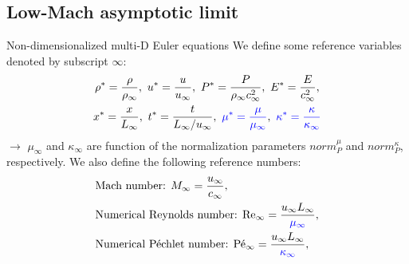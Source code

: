 \documentclass[xcolor=dvipsnames,10pt]{beamer}
\renewcommand{\Re}{\textrm{Re}}
\newcommand{\Pe}{\textrm{P\'e}}
\renewcommand{\Pr}{\textrm{Pr}}
\begin{document}
\subsection{Low-Mach asymptotic limit}
\begin{frame}{Non-dimensionalized multi-D Euler equations}
We define some reference variables denoted by subscript $\infty$:
\begin{multline}
\rho^*   = \frac{\rho}{\rho_\infty}           ,\
u^*      = \frac{u}{u_\infty}                 ,\
P^*      = \frac{P}{\rho_\infty c^2_\infty}   ,\
E^*      = \frac{E}{c^2_\infty }              ,\\
x^* = \frac{x}{L_\infty}                      ,\
t^* = \frac{t}{L_\infty / u_\infty}           ,\ 
\textcolor{blue}{\mu^*    = \frac{\mu}{\mu_\infty}}             ,\
\textcolor{blue}{\kappa^* = \frac{\kappa}{\kappa_\infty}}     \nonumber
\end{multline}
$\to$ $\mu_\infty$ and $\kappa_\infty$ are function of the normalization parameters $norm_P^\mu$ and $norm_P^\kappa$, respectively.
We also define the following reference numbers:
\begin{align}
&\text{Mach number: }M_\infty = \frac{u_\infty}{c_\infty}, \nonumber\\
&\text{Numerical Reynolds number: }\Re_\infty = \frac{u_\infty L_\infty}{\textcolor{blue}{\mu_\infty}} , \nonumber \\
&\text{Numerical P\'echlet number: }\Pe_\infty = \frac{u_\infty L_\infty}{\textcolor{blue}{\kappa_\infty}} , \nonumber
\end{align}
\end{frame}
\end{document}
